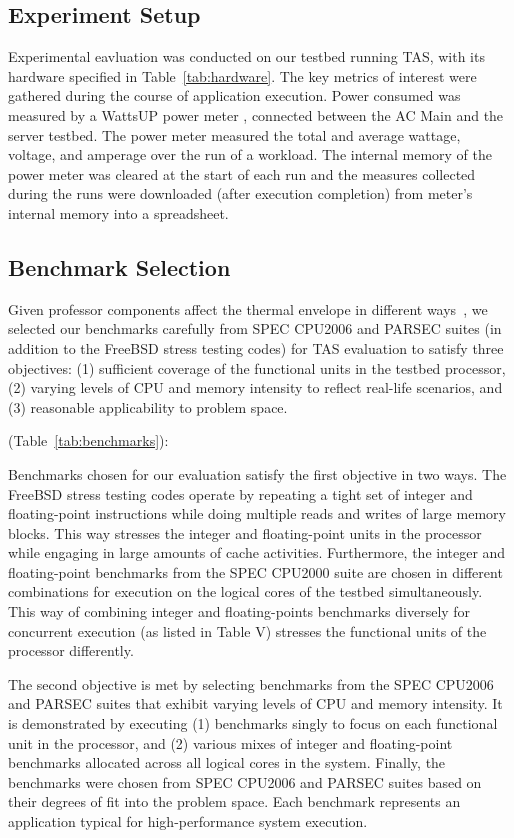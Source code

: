 \documentclass[times, 10pt,twocolumn]{IEEEtran}
\begin{document}
\subsection{Experiment Setup}
\label{sec:experiment-setup} 
Experimental eavluation was conducted on our testbed running TAS,
with its hardware specified in Table~\ref{tab:hardware}.
The key metrics of interest were gathered during the course of application execution.
Power consumed was measured by a WattsUP power meter \cite{WattsUp2006a},
connected between the AC Main and the server testbed.  
The power meter measured the total and
average wattage, voltage, and amperage over the run of a workload.  The
internal memory of the power meter was cleared at the start of each run
and the measures collected during the runs were downloaded (after
execution completion) from meter's internal memory into a spreadsheet.

\subsection{Benchmark Selection}
\label{sec:experimental-setup-1} 
Given professor components affect the
thermal envelope in different ways~\cite{Kumar2008},
we selected our benchmarks carefully from SPEC CPU2006 and PARSEC suites
(in addition to the FreeBSD stress testing codes) for TAS evaluation
to satisfy three objectives:
(1) sufficient coverage of the functional
units in the testbed processor, (2) varying levels of CPU and memory intensity
to reflect real-life scenarios, and (3) reasonable applicability to problem space.

(Table~\ref{tab:benchmarks}): 

Benchmarks chosen for our evaluation satisfy the first objective in two ways. 
The FreeBSD stress testing codes operate by repeating a tight
set of integer and floating-point instructions while doing multiple
reads and writes of large memory blocks.
This way stresses the integer and floating-point units
in the processor while engaging in large amounts of cache activities.
Furthermore, the integer and floating-point benchmarks from the SPEC CPU2000 suite are chosen in different combinations for execution on the logical cores
of the testbed simultaneously.
This way of combining integer and floating-points benchmarks diversely
for concurrent execution (as listed in Table V)
stresses the functional units of the processor differently. 

The second objective is met by selecting benchmarks from the SPEC CPU2006 and
PARSEC suites that exhibit varying levels of CPU and memory intensity.  
It is demonstrated by executing (1) benchmarks singly to
focus on each functional unit in the processor, and (2) various mixes of 
integer and floating-point benchmarks
allocated across all logical cores in the system.
Finally, the benchmarks were chosen from SPEC CPU2006 and PARSEC suites based
on their degrees of fit into the problem space.
Each benchmark represents an
application typical for high-performance system execution.
\end{document}
